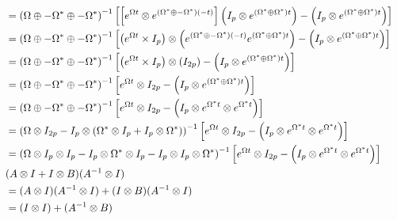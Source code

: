 \documentclass{article}
\begin{document}
\begin{align}
    \\&=\left(\Omega \oplus -\Omega^{*} \oplus -\Omega^{*}\right)^{-1} \left[\left[e^{\Omega t} \otimes e^{\left(\Omega^{*} \oplus -\Omega^{*}\right)(-t)}\right] \left(I_p \otimes e^{\left(\Omega^{*} \oplus \Omega^{*}\right)t}\right) - \left(I_p \otimes e^{\left(\Omega^{*} \oplus \Omega^{*}\right)t}\right)\right]
    \\&=\left(\Omega \oplus -\Omega^{*} \oplus -\Omega^{*}\right)^{-1} \left[\left(e^{\Omega t} \times I_p\right)\otimes\left(e^{\left(\Omega^{*} \oplus -\Omega^{*}\right)(-t)} e^{\left(\Omega^{*} \oplus \Omega^{*}\right)t}\right) - \left(I_p \otimes e^{\left(\Omega^{*} \oplus \Omega^{*}\right)t}\right)\right]
    \\&=\left(\Omega \oplus -\Omega^{*} \oplus -\Omega^{*}\right)^{-1} \left[\left(e^{\Omega t} \times I_p\right)\otimes\left(I_{2p}\right) - \left(I_p \otimes e^{\left(\Omega^{*} \oplus \Omega^{*}\right)t}\right)\right]
    \\&=\left(\Omega \oplus -\Omega^{*} \oplus -\Omega^{*}\right)^{-1} \left[e^{\Omega t}\otimes I_{2p} - \left(I_p \otimes e^{\left(\Omega^{*} \oplus \Omega^{*}\right)t}\right)\right]
    \\&=\left(\Omega \oplus -\Omega^{*} \oplus -\Omega^{*}\right)^{-1} \left[e^{\Omega t}\otimes I_{2p} - \left(I_p \otimes e^{\Omega^{*} t} \otimes e^{\Omega^{*} t}\right)\right]
    \\&=\left(\Omega \otimes I_{2p} - I_{p}\otimes \left(\Omega^{*} \otimes I_p + I_p \otimes \Omega^{*}\right)\right)^{-1} \left[e^{\Omega t}\otimes I_{2p} - \left(I_p \otimes e^{\Omega^{*} t} \otimes e^{\Omega^{*} t}\right)\right]
    \\&=\left(\Omega \otimes I_{p} \otimes I_{p} - I_{p}\otimes \Omega^{*} \otimes I_p - I_p \otimes I_p \otimes \Omega^{*}\right)^{-1} \left[e^{\Omega t}\otimes I_{2p} - \left(I_p \otimes e^{\Omega^{*} t} \otimes e^{\Omega^{*} t}\right)\right]
    \\&(A\otimes I + I\otimes B)(A^{-1}\otimes I)
    \\&=(A\otimes I)(A^{-1}\otimes I) + (I\otimes B)(A^{-1}\otimes I)
    \\&=(I\otimes I) + (A^{-1}\otimes B) 
\end{align}
\end{document}
